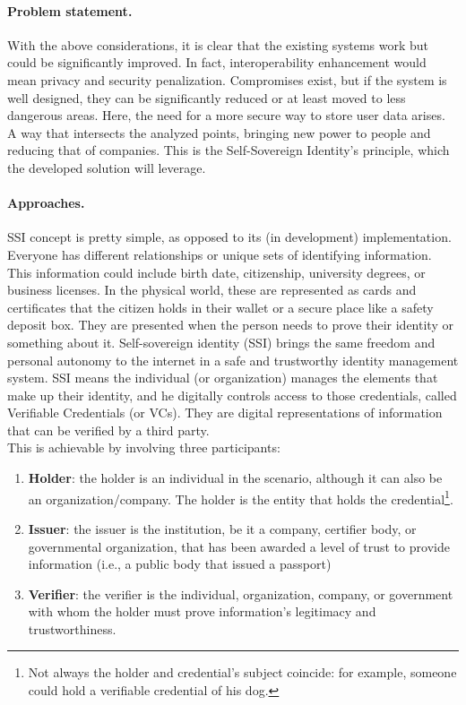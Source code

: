 \paragraph{Problem statement.} With the above considerations, it is clear that 
the existing systems work but could be significantly improved. In fact, 
interoperability enhancement would mean privacy and security penalization. 
Compromises exist, but if the system is well designed, they can be significantly 
reduced or at least moved to less dangerous areas. Here, the need for a more 
secure way to store user data arises. A way that intersects the analyzed points, 
bringing new power to people and reducing that of companies. This is the 
Self-Sovereign Identity's principle, which the developed solution will leverage.

\paragraph{Approaches.} SSI concept\cite{site:sovrinssi} is pretty simple, as opposed to its 
(in development) implementation. Everyone has different relationships or 
unique sets of identifying information. This information could include 
birth date, citizenship, university degrees, or business licenses. In the 
physical world, these are represented as cards and certificates that the 
citizen holds in their wallet or a secure place like a safety deposit 
box. They are presented when the person needs to prove their identity or 
something about it. Self-sovereign identity (SSI) brings the same freedom and 
personal autonomy to the internet in a safe and trustworthy identity management 
system. SSI means the individual (or organization) manages the elements that 
make up their identity, and he digitally controls access to those credentials,
called Verifiable Credentials (or VCs). They are digital representations of
information that can be verified by a third party.
\vspace*{0.3cm}\\
This is achievable by involving three participants:
\begin{enumerate}
    \item \textbf{Holder}: the holder is an individual in the scenario, 
    although it can also be an organization/company. The holder is the 
    entity that holds the credential\footnote{Not always the holder and 
    credential's subject coincide: for example, someone could hold a verifiable 
    credential of his dog.}.
    \item \textbf{Issuer}: the issuer is the institution, be it a company, 
    certifier body, or governmental organization, that has been awarded a 
    level of trust to provide information (i.e., a public body that issued 
    a passport)
    \item \textbf{Verifier}: the verifier is the individual, organization,
    company, or government with whom the holder must prove information's 
    legitimacy and trustworthiness.
\end{enumerate}
